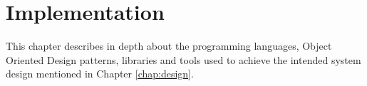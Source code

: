 \newpage
\chapter{Implementation}
This chapter describes in depth about the programming languages, Object Oriented Design patterns, libraries and tools used to achieve the intended system design 
mentioned in Chapter \ref{chap:design}.

%



